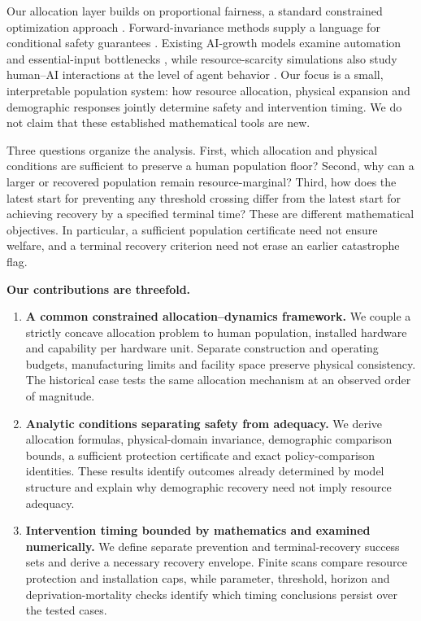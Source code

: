 \documentclass[12pt,a4paper]{article}
\theoremstyle{remark}
\begin{document}
Our allocation layer builds on proportional fairness, a standard constrained optimization approach \cite{kelly}. Forward-invariance methods supply a language for conditional safety guarantees \cite{aubin}. Existing AI-growth models examine automation and essential-input bottlenecks \cite{aghion}, while resource-scarcity simulations also study human--AI interactions at the level of agent behavior \cite{chen}. Our focus is a small, interpretable population system: how resource allocation, physical expansion and demographic responses jointly determine safety and intervention timing. We do not claim that these established mathematical tools are new.

Three questions organize the analysis. First, which allocation and physical conditions are sufficient to preserve a human population floor? Second, why can a larger or recovered population remain resource-marginal? Third, how does the latest start for preventing any threshold crossing differ from the latest start for achieving recovery by a specified terminal time? These are different mathematical objectives. In particular, a sufficient population certificate need not ensure welfare, and a terminal recovery criterion need not erase an earlier catastrophe flag.

\textbf{Our contributions are threefold.}
\begin{enumerate}
\item \textbf{A common constrained allocation--dynamics framework.} We couple a strictly concave allocation problem to human population, installed hardware and capability per hardware unit. Separate construction and operating budgets, manufacturing limits and facility space preserve physical consistency. The historical case tests the same allocation mechanism at an observed order of magnitude.
\item \textbf{Analytic conditions separating safety from adequacy.} We derive allocation formulas, physical-domain invariance, demographic comparison bounds, a sufficient protection certificate and exact policy-comparison identities. These results identify outcomes already determined by model structure and explain why demographic recovery need not imply resource adequacy.
\item \textbf{Intervention timing bounded by mathematics and examined numerically.} We define separate prevention and terminal-recovery success sets and derive a necessary recovery envelope. Finite scans compare resource protection and installation caps, while parameter, threshold, horizon and deprivation-mortality checks identify which timing conclusions persist over the tested cases.
\end{enumerate}
\end{document}
